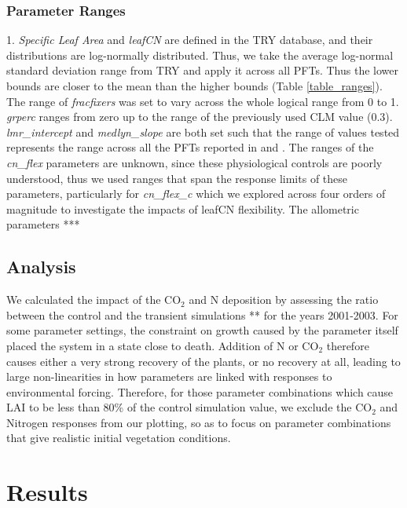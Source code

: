 \documentclass[draft,linenumbers]{agujournal}
\begin{document}
\subsubsection{Parameter Ranges}
1. \emph{Specific Leaf Area} and \emph{leafCN} are defined in the TRY database, and their distributions are log-normally distributed. Thus, we take the average log-normal standard deviation range from TRY and apply it across all PFTs. Thus the lower bounds are closer to the mean than the higher bounds (Table \ref{table_ranges}). The range of \emph{fracfixers} was set to vary across the whole logical range from 0 to 1.  \emph{grperc} ranges from zero up to the range of the previously used CLM value (0.3). \emph{lmr\_intercept} and \emph{medlyn\_slope} are both set such that the range of values tested represents the range across all the PFTs reported in \cite{atkin2015} and \cite{dekauwe2015}. The ranges of the \emph{cn\_flex} parameters are unknown, since these physiological controls are poorly understood, thus we used ranges that span the response limits of these parameters, particularly for  \emph{cn\_flex\_c} which we explored across four orders of magnitude to investigate the impacts of leafCN flexibility. The allometric parameters ***

\subsection{Analysis}
We calculated the impact of the CO$_{2}$ and N deposition by assessing the ratio between the control and the transient simulations ** for the years 2001-2003. For some parameter settings, the constraint on growth caused by the parameter itself placed the system in a state close to death. Addition of N or CO$_{2}$ therefore causes either a very strong recovery of the plants, or no recovery at all, leading to large non-linearities in how parameters are linked with responses to environmental forcing. Therefore, for those parameter combinations which cause LAI to be less than 80\% of the control simulation value, we exclude the CO$_{2}$ and Nitrogen responses from our plotting, so as to focus on parameter combinations that give realistic initial vegetation conditions. 


\section{Results}
\end{document}
